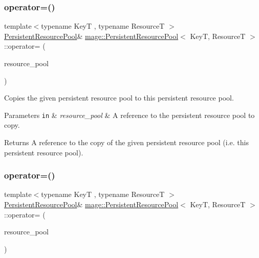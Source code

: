 \subsubsection{\texorpdfstring{operator=()}{operator=()}\hspace{0.1cm}{\footnotesize\ttfamily [1/2]}}
{\footnotesize\ttfamily template$<$typename KeyT , typename ResourceT $>$ \\
\hyperlink{classmage_1_1_persistent_resource_pool}{Persistent\+Resource\+Pool}\& \hyperlink{classmage_1_1_persistent_resource_pool}{mage\+::\+Persistent\+Resource\+Pool}$<$ KeyT, ResourceT $>$\+::operator= (\begin{DoxyParamCaption}\item[{const \hyperlink{classmage_1_1_persistent_resource_pool}{Persistent\+Resource\+Pool}$<$ KeyT, ResourceT $>$ \&}]{resource\+\_\+pool }\end{DoxyParamCaption})\hspace{0.3cm}{\ttfamily [delete]}}

Copies the given persistent resource pool to this persistent resource pool.


\begin{DoxyParams}[1]{Parameters}
\mbox{\tt in}  & {\em resource\+\_\+pool} & A reference to the persistent resource pool to copy. \\
\hline
\end{DoxyParams}
\begin{DoxyReturn}{Returns}
A reference to the copy of the given persistent resource pool (i.\+e. this persistent resource pool). 
\end{DoxyReturn}
\hypertarget{classmage_1_1_persistent_resource_pool_ad54817805379a1c16de14062333f0d1b}{}\label{classmage_1_1_persistent_resource_pool_ad54817805379a1c16de14062333f0d1b} 
\subsubsection{\texorpdfstring{operator=()}{operator=()}\hspace{0.1cm}{\footnotesize\ttfamily [2/2]}}
{\footnotesize\ttfamily template$<$typename KeyT , typename ResourceT $>$ \\
\hyperlink{classmage_1_1_persistent_resource_pool}{Persistent\+Resource\+Pool}\& \hyperlink{classmage_1_1_persistent_resource_pool}{mage\+::\+Persistent\+Resource\+Pool}$<$ KeyT, ResourceT $>$\+::operator= (\begin{DoxyParamCaption}\item[{\hyperlink{classmage_1_1_persistent_resource_pool}{Persistent\+Resource\+Pool}$<$ KeyT, ResourceT $>$ \&\&}]{resource\+\_\+pool }\end{DoxyParamCaption})\hspace{0.3cm}{\ttfamily [delete]}}


